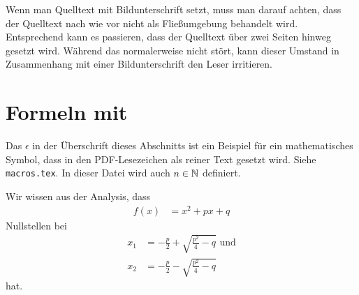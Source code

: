 Wenn man Quelltext mit Bildunterschrift setzt, muss man darauf achten, dass der Quelltext nach wie vor nicht als Fließumgebung behandelt wird. Entsprechend kann es passieren, dass der Quelltext über zwei Seiten hinweg gesetzt wird. Während das normalerweise nicht stört, kann dieser Umstand in Zusammenhang mit einer Bildunterschrift den Leser irritieren.

\section{Formeln mit \pdfepsilon}

Das $\epsilon$ in der Überschrift dieses Abschnitts ist ein Beispiel für ein mathematisches Symbol, dass in den PDF-Lesezeichen als reiner Text gesetzt wird. Siehe \texttt{macros.tex}. In dieser Datei wird auch $n \in \mathbb{N}$ definiert.

Wir wissen aus der Analysis, dass
\begin{align}
  f(x) &= x^2 + px + q
\end{align}
Nullstellen bei
\begin{align}
  x_1 &= -\frac p2 + \sqrt{\frac{p^2}4 - q} \text{ und}\\
  x_2 &= -\frac p2 - \sqrt{\frac{p^2}4 - q}
\end{align}
hat.



